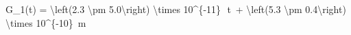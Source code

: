 G_1(t) = \SI[parse-numbers = false]{\left(2.3 \pm 5.0\right) \times 10^{-11}}{}\, \cdot \,t\, + \SI[parse-numbers = false]{\left(5.3 \pm 0.4\right) \times 10^{-10}}{\meter}